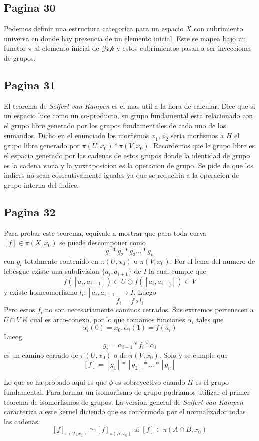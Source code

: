 \documentclass[letterpaper]{article}
\newcommand{\vank}{\emph{Seifert-van Kampen} }
\begin{document}
\subsection*{Pagina 30}
Podemos definir una estructura categorica para un espacio \(X\) con
cubrimiento universa en donde hay presencia de un elemento inicial. Este
se mapea bajo un functor \(\pi\) al elemento inicial de
\(\mathscr{Grp}\) y estos cubrimientos pasan a ser inyecciones de grupos.

\subsection*{Pagina 31}
El teorema de \vank es el mas util a la hora de calcular. Dice que si un
espacio luce como un co-producto, su grupo fundamental esta relacionado
con el grupo libre generado por los grupos fundamentales de cada uno de
los sumandos. Dicho en el enunciado los morfismos \(\phi_1, \phi_2\)
seria morfismos a \(H\) el grupo libre generado por \(\pi (U,x_0) * \pi
(V,x_0)\). Recordemos que le grupo libre es el espacio generado por las
cadenas de estos grupos donde la identidad de grupo es la cadena vacia y
la yuxtaposicion es la operacion de grupo. Se pide de que los indices no
sean cosecutivamente iguales ya que se reduciria a la operacion de grupo
interna del indice.

\subsection*{Pagina 32}
Para probar este teorema, equivale a mostrar que para toda curva \([f]
\in \pi (X,x_0)\) se puede descomponer como
\[ g_1 * g_2 * g_3 \dots * g_n \]
con \(g_i\) totalmente contenido en \(\pi (U, x_0)\) o \(\pi (V, x_0)\).
Por el lema del numero de lebesgue existe una subdivision \(\{a_i ,
a_{i+1}\}\) de \(I\) la cual cumple que
\[ f \left( [a_i , a_{i+1}] \right) \subset U  \oplus f \left( [a_i ,
    a_{i+1}] \right) \subset V \]
y existe homeomorfismo \(l_i : [a_i , a_{i+1}] \to I \). Luego
\[ f_i = f \circ l_i \]
Pero estos \(f_i\) no son necesariamente caminos cerrados. Sus extremos
pertenecen a \(U \cap V\) el cual es arco-conexo, por lo que tomamos
funciones \(\alpha_i\) tales que
\[ \alpha_i (0) = x_0 , \alpha_i (1) = f(a_i)\]
Lueog
\[ g_i = \alpha_{i-1} * f_i * \overline{\alpha_i} \]
es un camino cerrado de \(\pi(U, x_0)\) o de \(\pi (V,x_0)\). Solo y se
cumple que
\[ [f] = [g_1] * [g_2] * \dots * [g_n] \]

Lo que se ha probado aqui es que \(\phi\) es sobreyectivo cuando \(H\)
es el grupo fundamental. Para formar un isomorfismo de grupo podriamos
utilizar el primer teorema de isomorfismos de grupos. La version general
de \vank caracteriza a este kernel diciendo que es conformoda por el
normalizador todas las cadenas
\[ [f]_{\pi (A,x_0)} \simeq [f]_{\pi (B, x_0)} \text{ si } [f] \in \pi
  (A \cap B, x_0) \]
\end{document}

